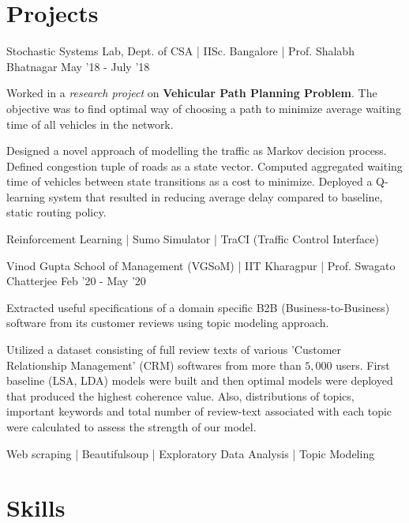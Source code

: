 \documentclass[letterpaper]{resume_config}
\begin{document}
\section{Projects}
\Project
    {Stochastic Systems Lab, Dept. of CSA | IISc. Bangalore | Prof. Shalabh Bhatnagar}
    {May '18 - July '18}
    {
        \item Worked in a \textit{research project} on \textbf{Vehicular Path Planning Problem}. The objective was to find optimal way of choosing a path to minimize average waiting time of all vehicles in the network.
    }
    {
        \item Designed a novel approach of modelling the traffic as Markov decision process. Defined congestion tuple of roads as a state vector. Computed aggregated waiting time of vehicles between state transitions as a cost to minimize. Deployed a Q-learning system that resulted in reducing average delay compared to baseline, static routing policy.
    }
    {Reinforcement Learning | Sumo Simulator | TraCI (Traffic Control Interface)}

\vspace{5pt}

\Project
    {Vinod Gupta School of Management (VGSoM) | IIT Kharagpur | Prof. Swagato Chatterjee}
    {Feb '20 - May '20}
    {
        \item Extracted useful specifications of a domain specific B2B (Business-to-Business) software from its customer reviews using topic modeling approach. 
    }
    {
        \item Utilized a dataset consisting of full review texts of various 'Customer Relationship Management' (CRM) softwares from more than $5,000$ users. First baseline (LSA, LDA) models were built and then optimal models were deployed that produced the highest coherence value. Also, distributions of topics, important keywords and total number of review-text associated with each topic were calculated to assess the strength of our model.
    }
    {Web scraping | Beautifulsoup | Exploratory Data Analysis | Topic Modeling}

\section{Skills}

\vspace{1pt}


\vspace{-2pt}
\end{document}
